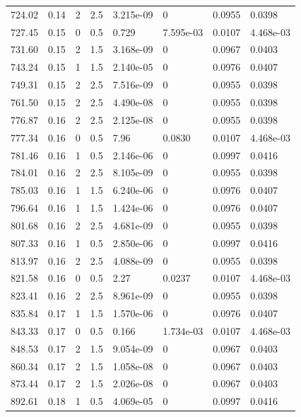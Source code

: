 \documentclass[preview]{standalone}
\begin{document}
{{{\begin{tabular}{L{1.2cm}C{1.2cm} C{0.3cm}C{0.5cm} C{1.4cm}C{1.4cm} C{1.4cm}C{1.4cm}}
  724.02  &  0.14  & 2     & 2.5 &  3.215e-09  & 0  & 0.0955 &  0.0398   \\ 
  727.45  &  0.15  & 0     & 0.5 &  0.729  & 7.595e-03  & 0.0107 &  4.468e-03   \\ 
  731.60  &  0.15  & 2     & 1.5 &  3.168e-09  & 0  & 0.0967 &  0.0403   \\ 
  743.24  &  0.15  & 1     & 1.5 &  2.140e-05  & 0  & 0.0976 &  0.0407   \\ 
  749.31  &  0.15  & 2     & 2.5 &  7.516e-09  & 0  & 0.0955 &  0.0398   \\ 
  761.50  &  0.15  & 2     & 2.5 &  4.490e-08  & 0  & 0.0955 &  0.0398   \\ 
  776.87  &  0.16  & 2     & 2.5 &  2.125e-08  & 0  & 0.0955 &  0.0398   \\ 
  777.34  &  0.16  & 0     & 0.5 &  7.96  & 0.0830  & 0.0107 &  4.468e-03   \\ 
  781.46  &  0.16  & 1     & 0.5 &  2.146e-06  & 0  & 0.0997 &  0.0416   \\ 
  784.01  &  0.16  & 2     & 2.5 &  8.105e-09  & 0  & 0.0955 &  0.0398   \\ 
  785.03  &  0.16  & 1     & 1.5 &  6.240e-06  & 0  & 0.0976 &  0.0407   \\ 
  796.64  &  0.16  & 1     & 1.5 &  1.424e-06  & 0  & 0.0976 &  0.0407   \\ 
  801.68  &  0.16  & 2     & 2.5 &  4.681e-09  & 0  & 0.0955 &  0.0398   \\ 
  807.33  &  0.16  & 1     & 0.5 &  2.850e-06  & 0  & 0.0997 &  0.0416   \\ 
  813.97  &  0.16  & 2     & 2.5 &  4.088e-09  & 0  & 0.0955 &  0.0398   \\ 
  821.58  &  0.16  & 0     & 0.5 &  2.27  & 0.0237  & 0.0107 &  4.468e-03   \\ 
  823.41  &  0.16  & 2     & 2.5 &  8.961e-09  & 0  & 0.0955 &  0.0398   \\ 
  835.84  &  0.17  & 1     & 1.5 &  1.570e-06  & 0  & 0.0976 &  0.0407   \\ 
  843.33  &  0.17  & 0     & 0.5 &  0.166  & 1.734e-03  & 0.0107 &  4.468e-03   \\ 
  848.53  &  0.17  & 2     & 1.5 &  9.054e-09  & 0  & 0.0967 &  0.0403   \\ 
  860.34  &  0.17  & 2     & 1.5 &  1.058e-08  & 0  & 0.0967 &  0.0403   \\ 
  873.44  &  0.17  & 2     & 1.5 &  2.026e-08  & 0  & 0.0967 &  0.0403   \\ 
  892.61  &  0.18  & 1     & 0.5 &  4.069e-05  & 0  & 0.0997 &  0.0416   \\ 

\end{tabular}}}}
\end{document}
